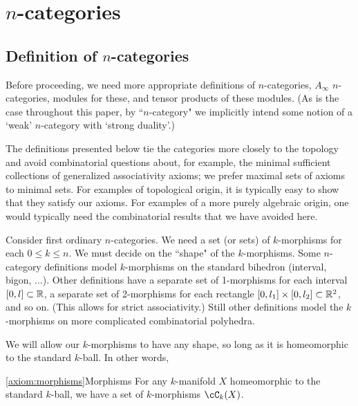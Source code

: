 
\def\xxpar#1#2{\smallskip\noindent{\bf #1} {\it #2} \smallskip}
\def\mmpar#1#2#3{\smallskip\noindent{\bf #1} (#2). {\it #3} \smallskip}

\section{$n$-categories}
\label{sec:ncats}

\subsection{Definition of $n$-categories}

Before proceeding, we need more appropriate definitions of $n$-categories, 
$A_\infty$ $n$-categories, modules for these, and tensor products of these modules.
(As is the case throughout this paper, by ``$n$-category" we implicitly intend some notion of
a `weak' $n$-category with `strong duality'.)

The definitions presented below tie the categories more closely to the topology
and avoid combinatorial questions about, for example, the minimal sufficient
collections of generalized associativity axioms; we prefer maximal sets of axioms to minimal sets.
For examples of topological origin, it is typically easy to show that they
satisfy our axioms.
For examples of a more purely algebraic origin, one would typically need the combinatorial
results that we have avoided here.

\medskip

Consider first ordinary $n$-categories.
We need a set (or sets) of $k$-morphisms for each $0\le k \le n$.
We must decide on the ``shape" of the $k$-morphisms.
Some $n$-category definitions model $k$-morphisms on the standard bihedron (interval, bigon, ...).
Other definitions have a separate set of 1-morphisms for each interval $[0,l] \subset \mathbb{R}$, 
a separate set of 2-morphisms for each rectangle $[0,l_1]\times [0,l_2] \subset \mathbb{R}^2$,
and so on.
(This allows for strict associativity.)
Still other definitions 
model the $k$-morphisms on more complicated combinatorial polyhedra.

We will allow our $k$-morphisms to have any shape, so long as it is homeomorphic to 
the standard $k$-ball.
In other words,

\begin{preliminary-axiom}{\ref{axiom:morphisms}}{Morphisms}
For any $k$-manifold $X$ homeomorphic 
to the standard $k$-ball, we have a set of $k$-morphisms
$\cC_k(X)$.
\end{preliminary-axiom}

